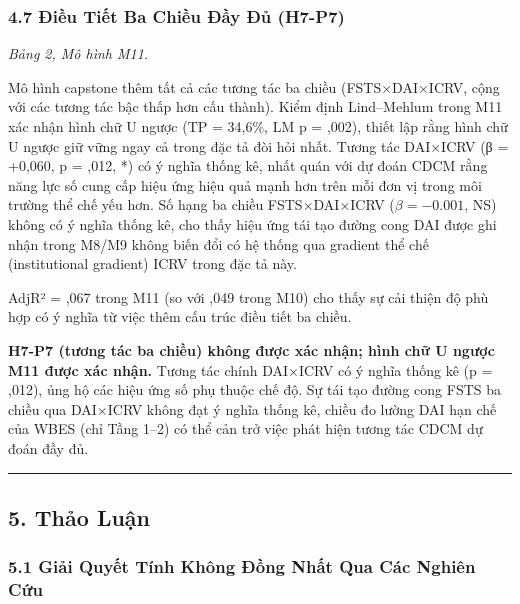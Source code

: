 \documentclass[12pt,a4paper]{article}
\begin{document}
\hypertarget{47-ux111iux1ec1u-tiux1ebft-ba-chiux1ec1u-ux111ux1ea7y-ux111ux1ee7-h7-p7}{%
\subsubsection{4.7 Điều Tiết Ba Chiều Đầy Đủ
(H7-P7)}\label{47-ux111iux1ec1u-tiux1ebft-ba-chiux1ec1u-ux111ux1ea7y-ux111ux1ee7-h7-p7}}

\emph{Bảng 2, Mô hình M11.}

Mô hình capstone thêm tất cả các tương tác ba chiều (FSTS×DAI×ICRV, cộng
với các tương tác bậc thấp hơn cấu thành). Kiểm định Lind--Mehlum trong
M11 xác nhận hình chữ U ngược (TP = 34,6\%, LM p = ,002), thiết lập rằng
hình chữ U ngược giữ vững ngay cả trong đặc tả đòi hỏi nhất. Tương tác
DAI×ICRV (β = +0,060, p = ,012, *) có ý nghĩa thống kê, nhất quán với dự
đoán CDCM rằng năng lực số cung cấp hiệu ứng hiệu quả mạnh hơn trên mỗi
đơn vị trong môi trường thể chế yếu hơn. Số hạng ba chiều FSTS×DAI×ICRV
(\(\beta = −0.001\), NS) không có ý nghĩa thống kê, cho thấy hiệu ứng
tái tạo đường cong DAI được ghi nhận trong M8/M9 không biến đổi có hệ
thống qua gradient thể chế (institutional gradient) ICRV trong đặc tả
này.

AdjR² = ,067 trong M11 (so với ,049 trong M10) cho thấy sự cải thiện độ
phù hợp có ý nghĩa từ việc thêm cấu trúc điều tiết ba chiều.

\textbf{H7-P7 (tương tác ba chiều) không được xác nhận; hình chữ U ngược
M11 được xác nhận.} Tương tác chính DAI×ICRV có ý nghĩa thống kê (p =
,012), ủng hộ các hiệu ứng số phụ thuộc chế độ. Sự tái tạo đường cong
FSTS ba chiều qua DAI×ICRV không đạt ý nghĩa thống kê, chiều đo lường
DAI hạn chế của WBES (chỉ Tầng 1--2) có thể cản trở việc phát hiện tương
tác CDCM dự đoán đầy đủ.

\begin{center}\rule{0.5\linewidth}{0.5pt}\end{center}

\hypertarget{5-thux1ea3o-luux1eadn}{%
\subsection{5. Thảo Luận}\label{5-thux1ea3o-luux1eadn}}

\hypertarget{51-giux1ea3i-quyux1ebft-tuxednh-khuxf4ng-ux111ux1ed3ng-nhux1ea5t-qua-cuxe1c-nghiuxean-cux1ee9u}{%
\subsubsection{5.1 Giải Quyết Tính Không Đồng Nhất Qua Các Nghiên
Cứu}\label{51-giux1ea3i-quyux1ebft-tuxednh-khuxf4ng-ux111ux1ed3ng-nhux1ea5t-qua-cuxe1c-nghiuxean-cux1ee9u}}
\end{document}
